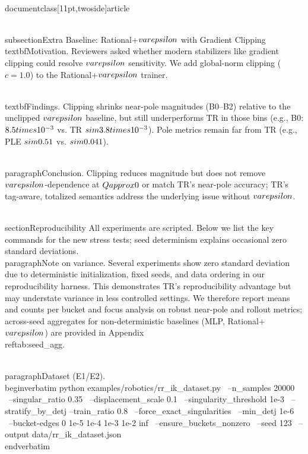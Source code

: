 \\documentclass[11pt,twoside]{article}
\begin{document}
\\subsection{Extra Baseline: Rational+$\\varepsilon$ with Gradient Clipping}
\\textbf{Motivation.} Reviewers asked whether modern stabilizers like gradient clipping could resolve $\\varepsilon$ sensitivity. We add global-norm clipping ($c=1.0$) to the Rational+$\\varepsilon$ trainer.

\\textbf{Findings.} Clipping shrinks near-pole magnitudes (B0--B2) relative to the unclipped $\\varepsilon$ baseline, but still underperforms TR in those bins (e.g., B0: $8.5\\times10^{-3}$ vs. TR $\\sim 3.8\\times10^{-3}$). Pole metrics remain far from TR (e.g., PLE $\\sim 0.51$ vs. $\\sim 0.041$).

\\paragraph{Conclusion.} Clipping reduces magnitude but does not remove $\\varepsilon$-dependence at $Q\\approx 0$ or match TR’s near-pole accuracy; TR’s tag-aware, totalized semantics address the underlying issue without $\\varepsilon$.

\\section{Reproducibility}
All experiments are scripted. Below we list the key commands for the new stress tests; seed determinism explains occasional zero standard deviations.
\\paragraph{Note on variance.} Several experiments show zero standard deviation due to deterministic initialization, fixed seeds, and data ordering in our reproducibility harness. This demonstrates TR's reproducibility advantage but may understate variance in less controlled settings. We therefore report means and counts per bucket and focus analysis on robust near-pole and rollout metrics; across-seed aggregates for non-deterministic baselines (MLP, Rational+$\\varepsilon$) are provided in Appendix~\\ref{tab:seed_agg}.

\\paragraph{Dataset (E1/E2).}
\\begin{verbatim}
python examples/robotics/rr_ik_dataset.py \
  --n_samples 20000 \
  --singular_ratio 0.35 \
  --displacement_scale 0.1 \
  --singularity_threshold 1e-3 \
  --stratify_by_detj --train_ratio 0.8 \
  --force_exact_singularities \
  --min_detj 1e-6 \
  --bucket-edges 0 1e-5 1e-4 1e-3 1e-2 inf \
  --ensure_buckets_nonzero \
  --seed 123 \
  --output data/rr_ik_dataset.json
\\end{verbatim}
\end{document}
